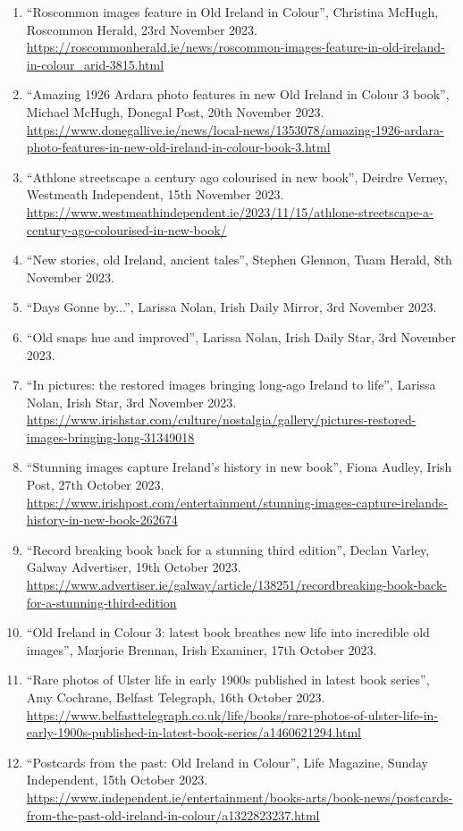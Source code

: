 \documentclass[10pt,a4paper]{res} %
\begin{document}
\begin{resume}
{\begin{enumerate}
\item ``Roscommon images feature in Old Ireland in Colour'', Christina McHugh, Roscommon Herald, 23rd November 2023. \url{https://roscommonherald.ie/news/roscommon-images-feature-in-old-ireland-in-colour_arid-3815.html}
\item ``Amazing 1926 Ardara photo features in new Old Ireland in Colour 3 book'', Michael McHugh, Donegal Post, 20th November 2023. \url{https://www.donegallive.ie/news/local-news/1353078/amazing-1926-ardara-photo-features-in-new-old-ireland-in-colour-book-3.html}
\item ``Athlone streetscape a century ago colourised in new book'', Deirdre Verney, Westmeath Independent, 15th November 2023. \url{https://www.westmeathindependent.ie/2023/11/15/athlone-streetscape-a-century-ago-colourised-in-new-book/}
\item ``New stories, old Ireland, ancient tales'', Stephen Glennon, Tuam Herald, 8th November 2023.
\item ``Days Gonne by...'', Larissa Nolan, Irish Daily Mirror, 3rd November 2023.
\item ``Old snaps hue and improved'', Larissa Nolan, Irish Daily Star, 3rd November 2023.
\item ``In pictures: the restored images bringing long-ago Ireland to life'', Larissa Nolan, Irish Star, 3rd November 2023. \url{https://www.irishstar.com/culture/nostalgia/gallery/pictures-restored-images-bringing-long-31349018}
\item ``Stunning images capture Ireland's history in new book'', Fiona Audley, Irish Post, 27th October 2023. \url{https://www.irishpost.com/entertainment/stunning-images-capture-irelands-history-in-new-book-262674}
\item ``Record breaking book back for a stunning third edition'', Declan Varley, Galway Advertiser, 19th October 2023. \url{https://www.advertiser.ie/galway/article/138251/recordbreaking-book-back-for-a-stunning-third-edition}
\item ``Old Ireland in Colour 3: latest book breathes new life into incredible old images'', Marjorie Brennan, Irish Examiner, 17th October 2023.
\item ``Rare photos of Ulster life in early 1900s published in latest book series'', Amy Cochrane, Belfast Telegraph, 16th October 2023. \url{https://www.belfasttelegraph.co.uk/life/books/rare-photos-of-ulster-life-in-early-1900s-published-in-latest-book-series/a1460621294.html}
\item ``Postcards from the past: Old Ireland in Colour'', Life Magazine, Sunday Independent, 15th October 2023. \url{https://www.independent.ie/entertainment/books-arts/book-news/postcards-from-the-past-old-ireland-in-colour/a1322823237.html}

\end{enumerate}}
\end{resume}
\end{document}
